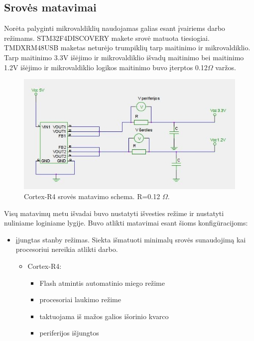 \documentclass[a4paper, 12pt]{article} %
\begin{document}
\begin{onehalfspacing}
\subsection{Srov\.es matavimai}
Nor\.{e}ta palyginti mikrovaldikli\k{u} naudojamas galias esant \k{i}vairiems darbo re\v{z}imams.
STM32F4DISCOVERY makete srov\.e matuota tiesiogiai. TMDXRM48USB maketas netur\.ejo 
trumpikli\k{u} tarp maitinimo ir mikrovaldiklio. Tarp maitinimo 3.3V i\v{s}\.ejimo ir mikrovaldiklio i\v{s}vad\k{u} maitinimo bei maitinimo 1.2V i\v{s}\.ejimo ir mikrovaldiklio logikos maitinimo buvo \k{i}terptos 0.12$\Omega$ var\v{z}os. 
\begin{figure}[H] %
\centering %
\includegraphics[scale=0.8]{pav/srovesc.jpeg} %
\captionsetup{labelformat=numbfirst} %
\captionsetup{labelseparator=tarpas}
\caption{Cortex-R4 srov\.{e}s matavimo schema. R=0.12 $\Omega$.}
\label{vienas}
\end{figure}
Vis\k{u} matavim\k{u} metu 
  i\v{s}vadai buvo nustatyti i\v{s}vesties re\v{z}ime ir 
  nustatyti nuliniame loginiame lygije. Buvo atlikti matavimai
  esant \v{s}ioms konfig\={u}racijoms:
\begin{itemize}
\item \k{i}jungtas stanby re\v{z}imas. Siekta i\v{s}matuoti minimal\k{u} srov\.{e}s sunaudojim\k{a} kai procesoriui nereikia atlikti darbo. 
\begin{itemize} 
\item Cortex-R4:
\begin{itemize}
\item Flash atmintis automatinio miego re\v{z}ime
\item procesoriai laukimo re\v{z}ime
\item taktuojama i\v{s} ma\v{z}os galios i\v{s}orinio kvarco 
\item periferijos i\v{s}jungtos
\end{itemize}


\end{itemize}
\end{itemize}
\end{onehalfspacing}
\end{document}

